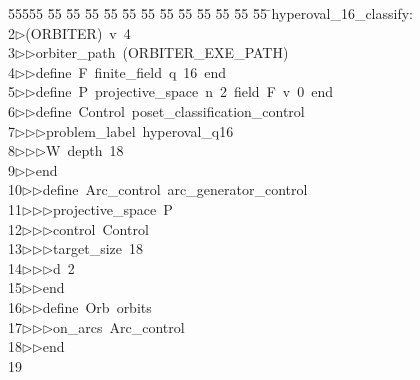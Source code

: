 %
%
\begin{tabbing}
55555 \= 55 \= 55 \= 55 \= 55 \= 55 \= 55 \= 55 \= 55 \= 55 \= 55 \= 55 \= 55 \= \>hyperoval\_16\_classify:\\[0pt]
2\>$\triangleright$\>(ORBITER)\ v\ 4\ \\[0pt]
3\>$\triangleright$\>$\triangleright$\>orbiter\_path\ (ORBITER\_EXE\_PATH)\ \\[0pt]
4\>$\triangleright$\>$\triangleright$\>define\ F\ finite\_field\ q\ 16\ end\ \\[0pt]
5\>$\triangleright$\>$\triangleright$\>define\ P\ projective\_space\ n\ 2\ field\ F\ v\ 0\ end\ \\[0pt]
6\>$\triangleright$\>$\triangleright$\>define\ Control\ poset\_classification\_control\ \\[0pt]
7\>$\triangleright$\>$\triangleright$\>$\triangleright$\>problem\_label\ hyperoval\_q16\ \\[0pt]
8\>$\triangleright$\>$\triangleright$\>$\triangleright$\>W\ depth\ 18\ \\[0pt]
9\>$\triangleright$\>$\triangleright$\>end\ \\[0pt]
10\>$\triangleright$\>$\triangleright$\>define\ Arc\_control\ arc\_generator\_control\ \\[0pt]
11\>$\triangleright$\>$\triangleright$\>$\triangleright$\>projective\_space\ P\ \\[0pt]
12\>$\triangleright$\>$\triangleright$\>$\triangleright$\>control\ Control\ \\[0pt]
13\>$\triangleright$\>$\triangleright$\>$\triangleright$\>target\_size\ 18\ \\[0pt]
14\>$\triangleright$\>$\triangleright$\>$\triangleright$\>d\ 2\ \\[0pt]
15\>$\triangleright$\>$\triangleright$\>end\ \\[0pt]
16\>$\triangleright$\>$\triangleright$\>define\ Orb\ orbits\ \\[0pt]
17\>$\triangleright$\>$\triangleright$\>$\triangleright$\>on\_arcs\ Arc\_control\ \\[0pt]
18\>$\triangleright$\>$\triangleright$\>end\\[0pt]
19\>\end{tabbing}
